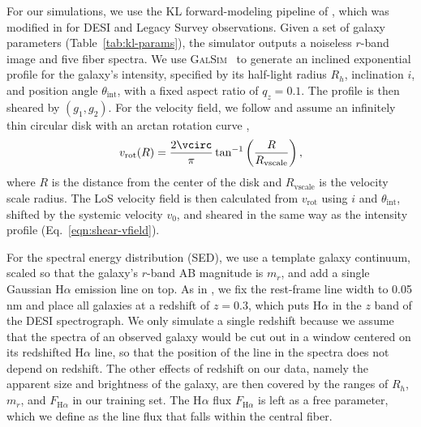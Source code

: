 For our simulations, we use the KL forward-modeling pipeline of \citep{KLInferenceI}, which was modified in \citep{KLDESI} for DESI and Legacy Survey observations. Given a set of galaxy parameters (Table~\ref{tab:kl-params}), the simulator outputs a noiseless $r$-band image and five fiber spectra. We use \textsc{GalSim}~\citep{galsim} to generate an inclined exponential profile for the galaxy's intensity, specified by its half-light radius $R_h$, inclination $i$, and position angle $\theta_\mathrm{int}$, with a fixed aspect ratio of $q_z=0.1$. The profile is then sheared by $(g_1, g_2)$. For the velocity field, we follow \citep{KLDESI} and assume an infinitely thin circular disk with an arctan rotation curve \citep{Courteau97},
\begin{equation}
\label{eqn:vrot}
    v_\mathrm{rot}(R) = \frac{2\vcirc}{\pi}\tan^{-1}\left(\frac{R}{R_\mathrm{vscale}}\right),
\end{equation}
where $R$ is the distance from the center of the disk and $R_\mathrm{vscale}$ is the velocity scale radius. The LoS velocity field is then calculated from $v_\mathrm{rot}$ using $i$ and $\theta_\mathrm{int}$, shifted by the systemic velocity $v_0$, and sheared in the same way as the intensity profile (Eq.~\ref{eqn:shear-vfield}).

For the spectral energy distribution (SED), we use a template galaxy continuum, scaled so that the galaxy's $r$-band AB magnitude is $m_r$, and add a single Gaussian H$\alpha$ emission line on top.  As in \citep{KLDESI}, we fix the rest-frame line width to 0.05 nm and place all galaxies at a redshift of $z=0.3$, which puts H$\alpha$ in the $z$ band of the DESI spectrograph. We only simulate a single redshift because we assume that the spectra of an observed galaxy would be cut out in a window centered on its redshifted H$\alpha$ line, so that the position of the line in the spectra does not depend on redshift. The other effects of redshift on our data, namely the apparent size and brightness of the galaxy, are then covered by the ranges of $R_h$, $m_r$, and $F_{\mathrm{H}\alpha}$ in our training set.  The H$\alpha$ flux $F_{\mathrm{H}\alpha}$ is left as a free parameter, which we define as the line flux that falls within the central fiber.

